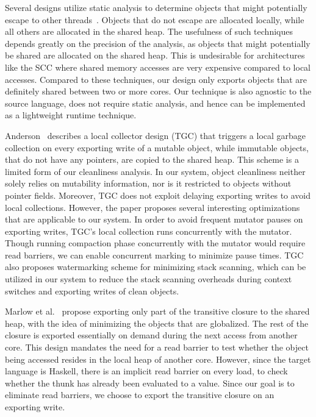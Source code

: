 Several designs utilize static analysis to determine objects that might
potentially escape to other threads~\cite{Jones05, Steensgaard00}. Objects that
do not escape are allocated locally, while all others are allocated in the
shared heap. The usefulness of such techniques depends greatly on the precision
of the analysis, as objects that might potentially be shared are allocated on
the shared heap. This is undesirable for architectures like the SCC where
shared memory accesses are very expensive compared to local accesses. Compared
to these techniques, our design only exports objects that are definitely shared
between two or more cores. Our technique is also agnostic to the source
language, does not require static analysis, and hence can be implemented as a
lightweight runtime technique.

Anderson~\cite{Anderson10} describes a local collector design (TGC) that
triggers a local garbage collection on every exporting write of a mutable
object, while immutable objects, that do not have any pointers, are copied to
the shared heap. This scheme is a limited form of our cleanliness analysis. In
our system, object cleanliness neither solely relies on mutability information,
nor is it restricted to objects without pointer fields. Moreover, TGC does not
exploit delaying exporting writes to avoid local collections. However, the
paper proposes several interesting optimizations that are applicable to our
system. In order to avoid frequent mutator pauses on exporting writes, TGC's
local collection runs concurrently with the mutator. Though running compaction
phase concurrently with the mutator would require read barriers, we can enable
concurrent marking to minimize pause times. TGC also proposes watermarking
scheme for minimizing stack scanning, which can be utilized in our system to
reduce the stack scanning overheads during context switches and exporting
writes of clean objects.

Marlow et al.~\cite{Marlow11} propose exporting only part of the transitive
closure to the shared heap, with the idea of minimizing the objects that are
globalized. The rest of the closure is exported essentially on demand during
the next access from another core. This design mandates the need for a read
barrier to test whether the object being accessed resides in the local heap of
another core. However, since the target language is Haskell, there is an
implicit read barrier on every load, to check whether the thunk has already
been evaluated to a value. Since our goal is to eliminate read barriers, we
choose to export the transitive closure on an exporting write.


